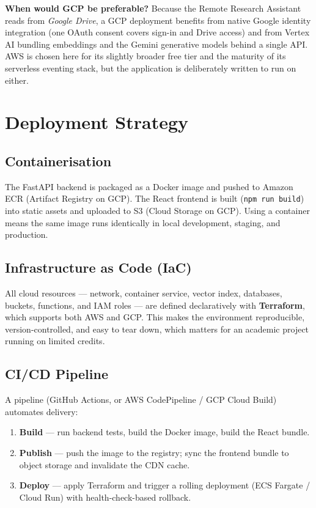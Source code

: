 \documentclass[12pt,a4paper]{article}
\begin{document}
\textbf{When would GCP be preferable?} Because the Remote Research Assistant
reads from \emph{Google Drive}, a GCP deployment benefits from native Google
identity integration (one OAuth consent covers sign-in and Drive access) and
from Vertex AI bundling embeddings and the Gemini generative models behind a
single API. AWS is chosen here for its slightly broader free tier and the
maturity of its serverless eventing stack, but the application is deliberately
written to run on either.

\section{Deployment Strategy}

\subsection{Containerisation}
The FastAPI backend is packaged as a Docker image and pushed to Amazon ECR
(Artifact Registry on GCP). The React frontend is built
(\texttt{npm run build}) into static assets and uploaded to S3 (Cloud Storage
on GCP). Using a container means the same image runs identically in local
development, staging, and production.

\subsection{Infrastructure as Code (IaC)}
All cloud resources --- network, container service, vector index, databases,
buckets, functions, and IAM roles --- are defined declaratively with
\textbf{Terraform}, which supports both AWS and GCP. This makes the environment
reproducible, version-controlled, and easy to tear down, which matters for an
academic project running on limited credits.

\subsection{CI/CD Pipeline}
A pipeline (GitHub Actions, or AWS CodePipeline / GCP Cloud Build) automates
delivery:
\begin{enumerate}[leftmargin=2em, nosep]
    \item \textbf{Build} --- run backend tests, build the Docker image, build
          the React bundle.
    \item \textbf{Publish} --- push the image to the registry; sync the
          frontend bundle to object storage and invalidate the CDN cache.
    \item \textbf{Deploy} --- apply Terraform and trigger a rolling deployment
          (ECS Fargate / Cloud Run) with health-check-based rollback.
\end{enumerate}
\end{document}
